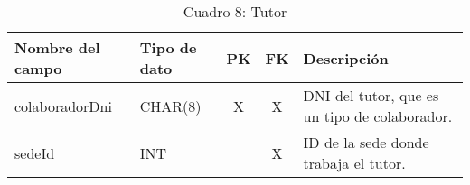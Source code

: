 \begin{table}[H]
	\centering
	\begin{tabular}{|l|l|c|c|l|}
		\hline
		\textbf{Nombre del campo} & \textbf{Tipo de dato} & \textbf{PK} & \textbf{FK} & \textbf{Descripción}                          \\
		\hline
		colaboradorDni            & CHAR(8)               & X           & X           & DNI del tutor, que es un tipo de colaborador. \\
		\hline
		sedeId                    & INT                   &             & X           & ID de la sede donde trabaja el tutor.         \\
		\hline
	\end{tabular}
	\caption{Cuadro 8: Tutor}
\end{table}